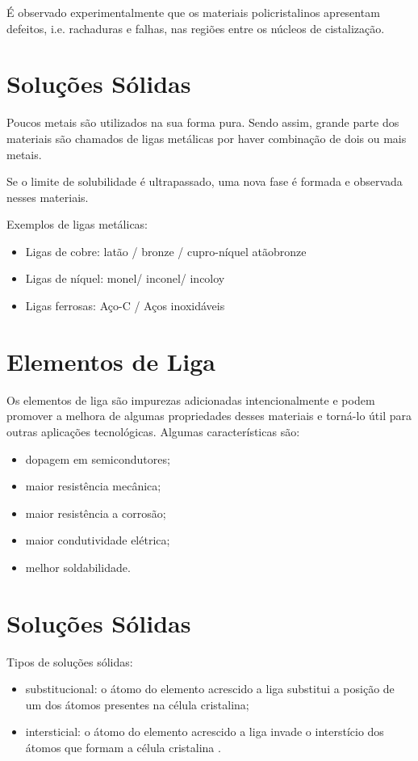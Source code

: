 É observado experimentalmente que os materiais policristalinos apresentam defeitos, i.e. rachaduras e falhas, nas regiões entre os núcleos de cistalização.


\section{Soluções Sólidas}

Poucos metais são utilizados na sua forma pura. Sendo assim, grande parte dos materiais são chamados de ligas metálicas por haver combinação de dois ou mais metais.

Se o limite de solubilidade é ultrapassado, uma nova fase é formada e observada nesses materiais.

Exemplos de ligas metálicas:

\begin{itemize}
	\item Ligas de cobre: latão / bronze / cupro-níquel atãobronze
	\item Ligas de níquel: monel/ inconel/ incoloy
	\item Ligas ferrosas: Aço-C / Aços inoxidáveis
\end{itemize}

\section{Elementos de Liga}

Os elementos de liga são impurezas adicionadas intencionalmente e podem promover a melhora de algumas propriedades desses materiais e torná-lo útil para outras aplicações tecnológicas. Algumas características são:

\begin{itemize}
	\item dopagem em semicondutores;
	\item maior resistência mecânica;
	\item maior resistência a corrosão;
	\item maior condutividade elétrica;
	\item melhor soldabilidade.
\end{itemize}


\section{Soluções Sólidas}

Tipos de soluções sólidas:

\begin{itemize}
	\item substitucional: o átomo do elemento acrescido a liga substitui a posição de um dos átomos presentes na célula cristalina;
	\item intersticial: o átomo do elemento acrescido a liga invade o interstício dos átomos que formam a célula cristalina .
\end{itemize}


